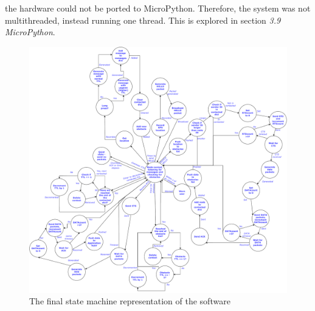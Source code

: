 \documentclass[12pt,a4paper]{report}
\begin{document}
the hardware could not be ported to MicroPython. Therefore, the system was not multithreaded, instead running one thread. This is explored in section \emph{3.9 MicroPython}.
\begin{figure}[h]
\begin{center}
\includegraphics[scale=0.45]{finalMachine.pdf}
\end{center}
\caption{The final state machine representation of the software}
\end{figure}
\end{document}
